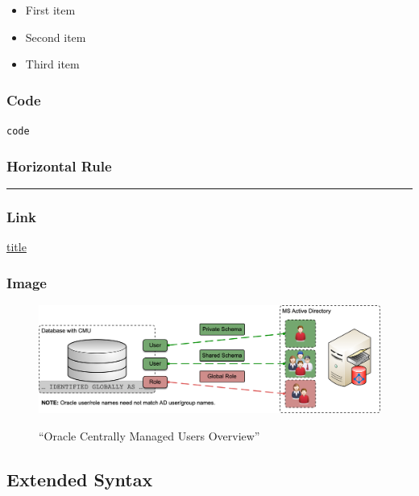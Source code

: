 \documentclass[
  a4paper,
  ,captions=tableheading
]{scrartcl}
\newcommand{\passthrough}[1]{#1}
\providecommand{\tightlist}{%
  \setlength{\itemsep}{0pt}\setlength{\parskip}{0pt}}
\providecommand{\pandocbounded}[1]{%
  \begin{adjustbox}{max size={\linewidth}{\textheight}}#1\end{adjustbox}%
}
\begin{document}
\begin{itemize}
\tightlist
\item
  First item
\item
  Second item
\item
  Third item
\end{itemize}

\subsubsection{Code}\label{code}

\passthrough{\lstinline!code!}

\subsubsection{Horizontal Rule}\label{horizontal-rule}

\begin{center}\rule{0.5\linewidth}{0.5pt}\end{center}

\subsubsection{Link}\label{link}

\href{https://www.example.com}{title}

\subsubsection{Image}\label{image}

\begin{figure}
\centering
\pandocbounded{\includegraphics[keepaspectratio,alt={``Oracle Centrally Managed Users Overview''}]{CMU_overview.png}}
\caption{``Oracle Centrally Managed Users Overview''}
\end{figure}

\subsection{Extended Syntax}\label{extended-syntax}
\end{document}
